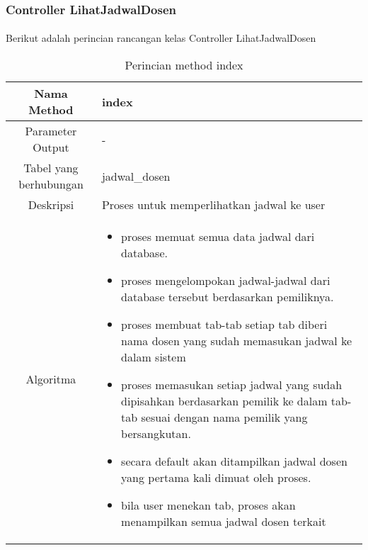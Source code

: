 \subsubsection{Controller LihatJadwalDosen}
\paragraph{} Berikut adalah perincian rancangan kelas Controller LihatJadwalDosen \\
\begin{center}
\begin{table}[H]
\begin{tabular}{|c|p{11cm}|}
\hline
Nama Method 	& 	index 	\\
\hline
Parameter Output & - \\
\hline
Tabel yang berhubungan & jadwal\_dosen \\
\hline
Deskripsi	& Proses untuk memperlihatkan jadwal ke user \\
\hline
Algoritma	& \begin{itemize}
				\item proses memuat semua data jadwal dari database.
				\item proses mengelompokan jadwal-jadwal dari database tersebut berdasarkan pemiliknya.
				\item proses membuat tab-tab setiap tab diberi nama dosen yang sudah memasukan jadwal ke dalam sistem
				\item proses memasukan setiap jadwal yang sudah dipisahkan berdasarkan pemilik ke dalam tab-tab sesuai dengan nama pemilik yang bersangkutan.
				\item secara default akan ditampilkan jadwal dosen yang pertama kali dimuat oleh proses.
				\item bila user menekan tab, proses akan menampilkan semua jadwal dosen terkait
				\end{itemize} \\
\hline
\end{tabular}
\caption{Perincian method index}
\end{table}
\end{center}


